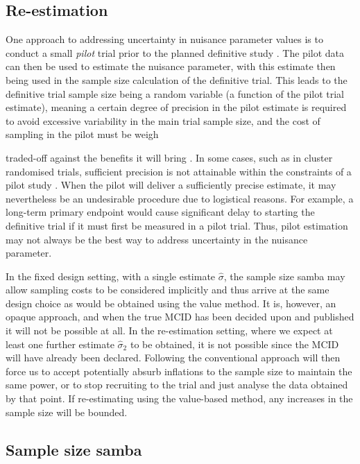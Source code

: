 \documentclass[sagev, Crown]{sagej}
\begin{document}
\subsection{Re-estimation}

One approach to addressing uncertainty in nuisance parameter values is to conduct a small \emph{pilot} trial prior to the planned definitive study \cite{Browne1995, Gould2001, Friede2006}. The pilot data can then be used to estimate the nuisance parameter, with this estimate then being used in the sample size calculation of the definitive trial. This leads to the definitive trial sample size being a random variable (a function of the pilot trial estimate),  meaning a certain degree of precision in the pilot estimate is required to avoid excessive variability in the main trial sample size, and the cost of sampling in the pilot must be weigh

traded-off against the benefits it will bring \cite{Teare2014, Whitehead2015}. In some cases, such as in cluster randomised trials, sufficient precision is not attainable within the constraints of a pilot study \cite{Lake2002, Eldridge2015}. When the pilot will deliver a sufficiently  precise estimate, it may nevertheless be an undesirable procedure due to logistical reasons. For example, a long-term primary endpoint would cause significant delay to starting the definitive trial if it must first be measured in a pilot trial. Thus, pilot estimation may not always be the best way to address uncertainty in the nuisance parameter.

In the fixed design setting, with a single estimate $\hat{\sigma}$, the sample size samba may allow sampling costs to be considered implicitly and thus arrive at the same design choice as would be obtained using the value method. It is, however, an opaque approach, and when the true MCID has been decided upon and published it will not be possible at all. In the re-estimation setting, where we expect at least one further estimate $\hat{\sigma}_2$ to be obtained, it is not possible since the MCID will have already been declared. Following the conventional approach will then force us to accept potentially absurb inflations to the sample size to maintain the same power, or to stop recruiting to the trial and just analyse the data obtained by that point. If re-estimating using the value-based method, any increases in the sample size will be bounded.

\subsection{Sample size samba}
\end{document}
